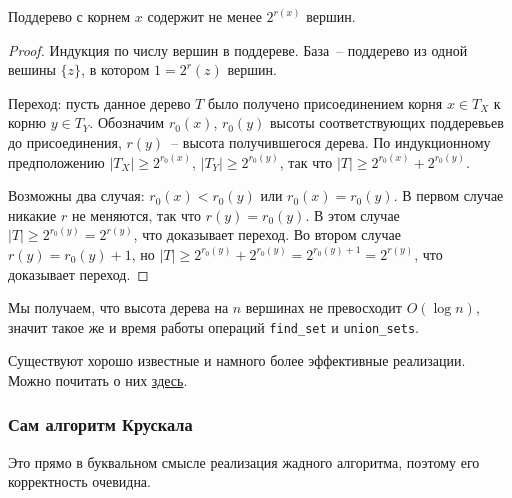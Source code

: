 \begin{lemma*}
    Поддерево с корнем $x$ содержит не менее $2^{r(x)}$ вершин.
\end{lemma*}
\begin{proof}
    Индукция по числу вершин в поддереве. База~-- поддерево из одной вешины $\{z\}$, в котором $1 = 2^r(z)$ вершин. 
    
    Переход: пусть данное дерево $T$ было получено присоединением корня $x \in T_X$ к корню $y \in T_Y$. Обозначим $r_0(x)$, $r_0(y)$ высоты соответствующих поддеревьев до присоединения, $r(y)$~-- высота получившегося дерева. По индукционному предположению $|T_X| \geq 2^{r_0(x)}$, $|T_Y| \geq 2^{r_0(y)}$, так что $|T| \geq 2^{r_0(x)} + 2^{r_0(y)}$. 
    
    Возможны два случая: $r_0(x) < r_0(y)$ или $r_0(x) = r_0(y)$. В первом случае никакие $r$ не меняются, так что $r(y) = r_0(y)$. В этом случае $|T| \geq 2^{r_0(y)} = 2^{r(y)}$, что доказывает переход. Во втором случае $r(y) = r_0(y) + 1$, но $|T| \geq 2^{r_0(y)} + 2^{r_0(y)} = 2^{r_0(y) + 1} = 2^{r(y)}$, что доказывает переход.
\end{proof}

Мы получаем, что высота дерева на $n$ вершинах не превосходит $O(\log n)$, значит такое же и время работы операций {\tt find\_set} и {\tt union\_sets}. 

\begin{nb*}
    Существуют хорошо известные и намного более эффективные реализации. Можно почитать о них \href{https://e-maxx.ru/algo/dsu}{здесь}.
\end{nb*}

\subsubsection{Сам алгоритм Крускала}
\begin{algorithm}[H]
	\DontPrintSemicolon
\end{algorithm}
Это прямо в буквальном смысле реализация жадного алгоритма, поэтому его корректность очевидна.

